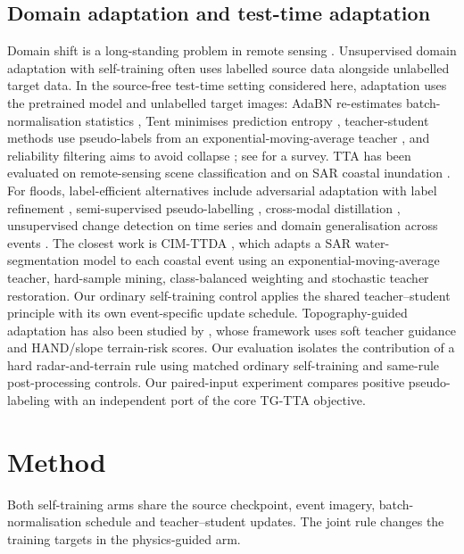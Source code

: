 \documentclass[a4paper,fleqn]{cas-sc}
\begin{document}
\subsection{Domain adaptation and test-time adaptation}
Domain shift is a long-standing problem in remote sensing \citep{tuia2016darsreview}. Unsupervised domain adaptation with self-training \citep{zou2018cbst,hoyer2022daformer} often uses labelled source data alongside unlabelled target data. In the source-free test-time setting considered here, adaptation uses the pretrained model and unlabelled target images: AdaBN re-estimates batch-normalisation statistics \citep{li2018adabn,schneider2020covariate}, Tent minimises prediction entropy \citep{wang2021tent}, teacher-student methods use pseudo-labels from an exponential-moving-average teacher \citep{tarvainen2017meanteacher,wang2022cotta}, and reliability filtering aims to avoid collapse \citep{niu2022eata,niu2023sar}; see \citet{liang2025ttasurvey} for a survey. TTA has been evaluated on remote-sensing scene classification \citep{liang2024lscdtta} and on SAR coastal inundation \citep{chen2026cimttda}. For floods, label-efficient alternatives include adversarial adaptation with label refinement \citep{akiva2021h2onet}, semi-supervised pseudo-labelling \citep{paul2021semisup}, cross-modal distillation \citep{garg2023crossmodal}, unsupervised change detection on time series \citep{yadav2022unsupts} and domain generalisation across events \citep{turkmenli2025dgflood}. The closest work is CIM-TTDA \citep{chen2026cimttda}, which adapts a SAR water-segmentation model to each coastal event using an exponential-moving-average teacher, hard-sample mining, class-balanced weighting and stochastic teacher restoration. Our ordinary self-training control applies the shared teacher--student principle with its own event-specific update schedule. Topography-guided adaptation has also been studied by \citet{song2026tgtta}, whose framework uses soft teacher guidance and HAND/slope terrain-risk scores. Our evaluation isolates the contribution of a hard radar-and-terrain rule using matched ordinary self-training and same-rule post-processing controls. Our paired-input experiment compares positive pseudo-labeling with an independent port of the core TG-TTA objective.


\section{Method}
\label{sec:method}
Both self-training arms share the source checkpoint, event imagery, batch-normalisation schedule and teacher--student updates. The joint rule changes the training targets in the physics-guided arm.
\end{document}
